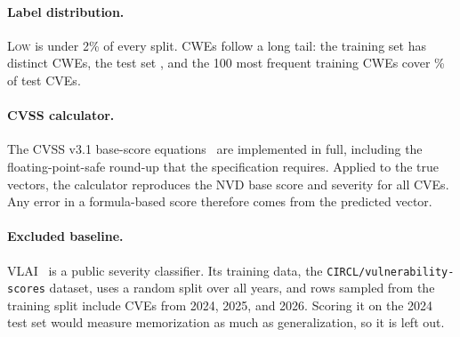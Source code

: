 

\paragraph{Label distribution.}
\textsc{Low} is under 2\% of every split.
CWEs follow a long tail: the training set has \nTrainCwes{} distinct CWEs, the test set \nTestCwes{}, and the 100 most frequent training CWEs cover \nTopCov\% of test CVEs.

\paragraph{CVSS calculator.}
The CVSS v3.1 base-score equations~\citep{first2019cvss31} are implemented in full, including the floating-point-safe round-up that the specification requires.
Applied to the true vectors, the calculator reproduces the NVD base score and severity for all \nAll{} CVEs.
Any error in a formula-based score therefore comes from the predicted vector.

\paragraph{Excluded baseline.}
VLAI~\citep{bonhomme2025vlai} is a public severity classifier.
Its training data, the \texttt{CIRCL/vulnerability-scores} dataset, uses a random split over all years, and rows sampled from the training split include CVEs from 2024, 2025, and 2026.
Scoring it on the 2024 test set would measure memorization as much as generalization, so it is left out.
